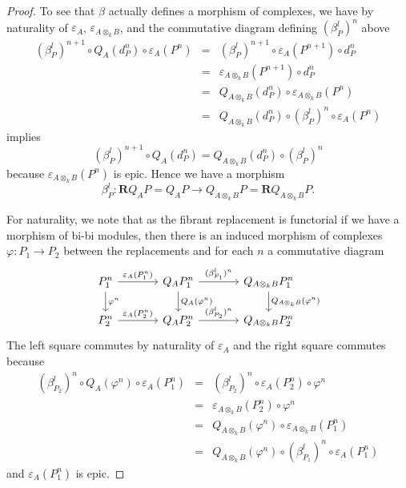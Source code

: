 \begin{proof}
  To see that \(\beta\) actually defines a morphism of complexes, we have by naturality of \(\varepsilon_A\), \(\varepsilon_{A \otimes_k B}\), and the commutative diagram defining \((\beta^l_P)^n\) above 
  \begin{eqnarray*}
    (\beta^l_P)^{n+1} \circ Q_{A}(d^n_{P}) \circ \varepsilon_{A}(P^n)
    &=& (\beta^l_P)^{n+1} \circ \varepsilon_{A}(P^{n+1}) \circ d^n_{P}\\
    &=& \varepsilon_{A \otimes_k B}(P^{n+1}) \circ d^n_{P}\\
    &=& Q_{A \otimes_k B}(d_{P}^n) \circ \varepsilon_{A \otimes_k B}(P^n)\\
    &=& Q_{A \otimes_k B}(d_{P}^n) \circ (\beta^l_P)^n \circ \varepsilon_{A}(P^n)
  \end{eqnarray*}
  implies
  \[(\beta^l_P)^{n+1} \circ Q_{A}(d^n_{P}) = Q_{A \otimes_k B}(d^n_{P}) \circ (\beta^l_P)^n\]
  because \(\varepsilon_{A \otimes_k B}(P^n)\) is epic. Hence we have a morphism
  \[\beta^l_P \colon \mathbf{R}Q_{A} P = Q_{A} P \to Q_{A \otimes_k B} P = \mathbf{R}Q_{A \otimes_k B} P.\]

  For naturality, we note that as the fibrant replacement is functorial if we have a morphism of bi-bi modules, then there is an induced morphism of complexes \(\varphi \colon P_1 \to P_2\) between the replacements and for each \(n\) a commutative diagram 
  \[\begin{tikzcd}[column sep=large]
  P_1^n \arrow{d}{\varphi^n}\arrow{r}{\varepsilon_{A}(P_1^n)} & Q_{A} P_1^n\arrow{d}{Q_{A}(\varphi^n)} \arrow{r}{(\beta^l_{P_1})^n} & Q_{A \otimes_k B}P_1^n \arrow{d}{Q_{A \otimes_k B}(\varphi^n)}\\
  P_2^n \arrow{r}{\varepsilon_{A}(P_2^n)} & Q_{A} P_2^n \arrow{r}{(\beta^l_{P_2})^n} & Q_{A \otimes_k B} P_2^n
  \end{tikzcd}\]  The left square commutes by naturality of \(\varepsilon_{A}\) and the right square commutes because
  \begin{eqnarray*}
    (\beta^l_{P_2})^n \circ Q_{A}(\varphi^n) \circ \varepsilon_{A}(P_1^n)
    &=& (\beta^l_{P_2})^n \circ \varepsilon_{A}(P_2^n) \circ \varphi^n\\
    &=&  \varepsilon_{A \otimes_k B}(P_2^n) \circ \varphi^n\\
    &=& Q_{A \otimes_k B}(\varphi^n) \circ \varepsilon_{A \otimes_k B}(P_1^n)\\
    &=& Q_{A \otimes_k B}(\varphi^n) \circ (\beta^l_{P_1})^n \circ \varepsilon_{A}(P_1^n)
  \end{eqnarray*}
  and \(\varepsilon_{A}(P_1^n)\) is epic.
\end{proof}

